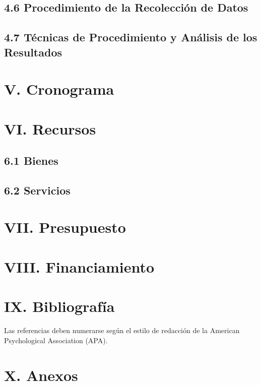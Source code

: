 \documentclass[12pt]{../componentes/uns}
\begin{document}
\subsection*{4.6 Procedimiento de la Recolección de Datos}
\lipsum[20]

\subsection*{4.7 Técnicas de Procedimiento y Análisis de los Resultados}
\lipsum[21]

\section*{V. Cronograma}
\lipsum[22]

\section*{VI. Recursos}

\subsection*{6.1 Bienes}
\lipsum[23]

\subsection*{6.2 Servicios}
\lipsum[24]

\section*{VII. Presupuesto}
\lipsum[25]

\section*{VIII. Financiamiento}
\lipsum[26]

\section*{IX. Bibliografía}
Las referencias deben numerarse según el estilo de redacción de la American Psychological Association (APA).

\section*{X. Anexos}
\lipsum[27]
\end{document}
